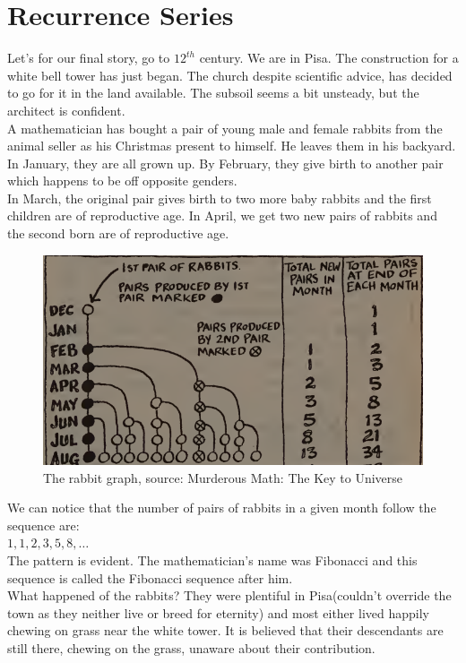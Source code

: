 \section{Recurrence Series}
Let's for our final story, go to $12^{th}$ century. We are in Pisa. The construction for a white bell tower has just began. The church despite scientific advice, has decided to go for it in the land available. The subsoil seems a bit unsteady, but the architect is confident.\\
A mathematician has bought a pair of young male and female rabbits from the animal seller as his Christmas present to himself. He leaves them in his backyard. In January, they are all grown up. By February, they give birth to another pair which happens to be off opposite genders.\\
In March, the original pair gives birth to two more baby rabbits and the first children are of reproductive age. In April, we get two new pairs of rabbits and the second born are of reproductive age.
\begin{figure}
    \centering
    \includegraphics[width=0.75\linewidth]{Photos/Rabbits fibbonacci.png}
    \caption{The rabbit graph, source: Murderous Math: The Key to Universe}
    
\end{figure}
We can notice that the number of pairs of rabbits in a given month follow the sequence are:\\
$1, 1, 2,3, 5, 8, \dots$\\
The pattern is evident. The mathematician's name was Fibonacci and this sequence is called the Fibonacci sequence after him.\\
What happened of the rabbits? They were plentiful in Pisa(couldn't override the town as they neither live or breed for eternity)  and most either lived happily chewing on grass near the white tower. It is believed that their descendants are still there, chewing on the grass, unaware about their contribution.\\
